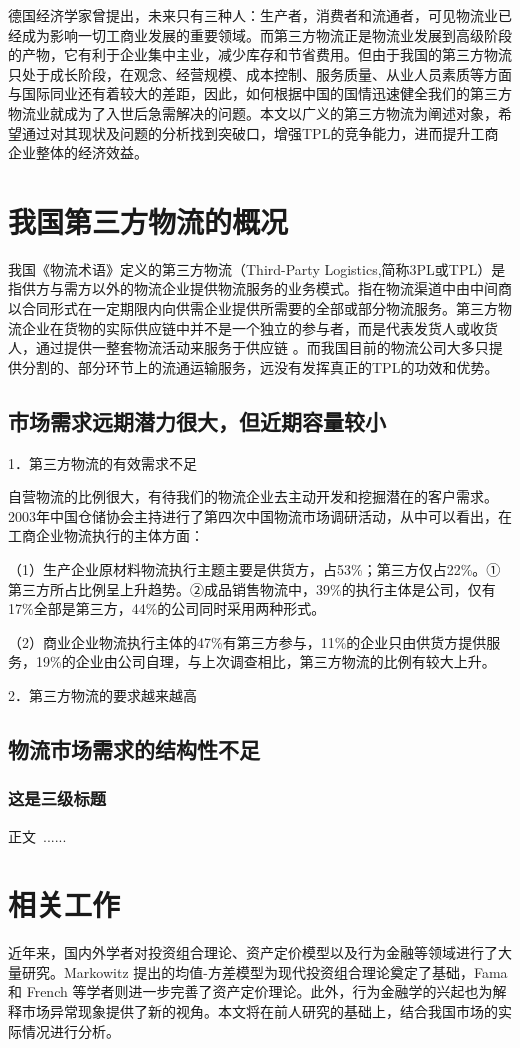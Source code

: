 \documentclass[UTF-8]{CUFEpaper}
\begin{document}
德国经济学家曾提出，未来只有三种人：生产者，消费者和流通者，可见物流业已经成为影响一切工商业发展的重要领域。而第三方物流正是物流业发展到高级阶段的产物，它有利于企业集中主业，减少库存和节省费用。但由于我国的第三方物流只处于成长阶段，在观念、经营规模、成本控制、服务质量、从业人员素质等方面与国际同业还有着较大的差距，因此，如何根据中国的国情迅速健全我们的第三方物流业就成为了入世后急需解决的问题。本文以广义的第三方物流为阐述对象，希望通过对其现状及问题的分析找到突破口，增强TPL的竞争能力，进而提升工商企业整体的经济效益。

\section{我国第三方物流的概况}
我国《物流术语》定义的第三方物流（Third-Party Logistics,简称3PL或TPL）是指供方与需方以外的物流企业提供物流服务的业务模式。指在物流渠道中由中间商以合同形式在一定期限内向供需企业提供所需要的全部或部分物流服务。第三方物流企业在货物的实际供应链中并不是一个独立的参与者，而是代表发货人或收货人，通过提供一整套物流活动来服务于供应链 。而我国目前的物流公司大多只提供分割的、部分环节上的流通运输服务，远没有发挥真正的TPL的功效和优势。
\subsection{市场需求远期潜力很大，但近期容量较小}
1．第三方物流的有效需求不足

自营物流的比例很大，有待我们的物流企业去主动开发和挖掘潜在的客户需求。2003年中国仓储协会主持进行了第四次中国物流市场调研活动，从中可以看出，在工商企业物流执行的主体方面：

（1）生产企业原材料物流执行主题主要是供货方，占53\%；第三方仅占22\%。①第三方所占比例呈上升趋势。②成品销售物流中，39\%的执行主体是公司，仅有17\%全部是第三方，44\%的公司同时采用两种形式。

（2）商业企业物流执行主体的47\%有第三方参与，11\%的企业只由供货方提供服务，19\%的企业由公司自理，与上次调查相比，第三方物流的比例有较大上升。

2．第三方物流的要求越来越高
\subsection{物流市场需求的结构性不足}
\subsubsection{这是三级标题}
正文\ ......


\section{相关工作}
近年来，国内外学者对投资组合理论、资产定价模型以及行为金融等领域进行了大量研究。Markowitz 提出的均值-方差模型为现代投资组合理论奠定了基础，Fama 和 French 等学者则进一步完善了资产定价理论。此外，行为金融学的兴起也为解释市场异常现象提供了新的视角。本文将在前人研究的基础上，结合我国市场的实际情况进行分析。
\end{document}
